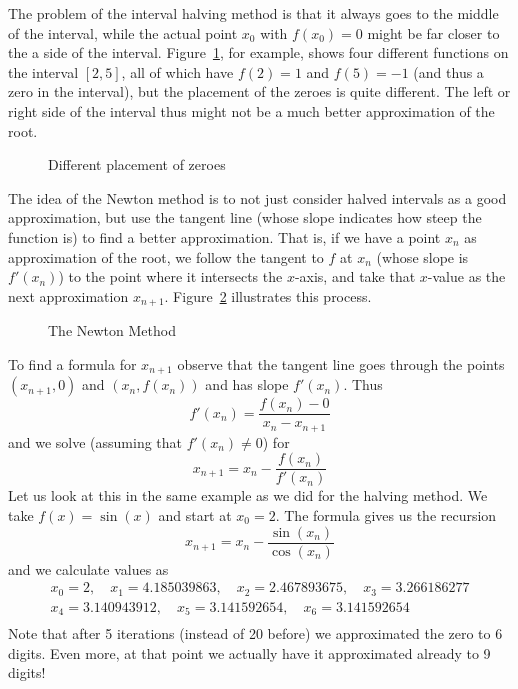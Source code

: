 The problem of the interval halving method is that it always goes to the
middle of the interval, while the actual point $x_0$ with $f(x_0)=0$ might
be far closer to the a side of the interval. Figure~\ref{fignewton4}, for
example, shows four different functions on the interval $[2,5]$, all of
which have $f(2)=1$ and $f(5)=-1$ (and thus a zero in the interval), but the
placement of the zeroes is quite different. The left or right side of the
interval thus might not be a much better approximation of the root.
\begin{figure}
\begin{center}
\end{center}
\caption{Different placement of zeroes}
\label{fignewton4}
\end{figure}

The idea of the Newton method is to not just consider halved intervals
as a good approximation, but use the tangent line (whose slope
indicates how steep the function is) to find a better
approximation. That
is, if we have a point $x_n$ as approximation of the root, we follow the
tangent to $f$ at $x_n$ (whose slope is $f'(x_n)$) to the point where it
intersects the $x$-axis, and take that $x$-value as the next approximation
$x_{n+1}$. Figure~\ref{fignewtonm} illustrates this process.

\begin{figure}
\begin{center}
\end{center}
\caption{The Newton Method}
\label{fignewtonm}
\end{figure}

To find a formula for $x_{n+1}$ observe that the tangent line goes through
the points $(x_{n+1},0)$ and $(x_n,f(x_n))$ and has slope $f'(x_n)$. Thus
\[
f'(x_n)=\frac{f(x_n)-0}{x_n-x_{n+1}}
\]
and we solve (assuming that $f'(x_n)\not=0$) for
\[
x_{n+1}=x_n-\frac{f(x_n)}{f'(x_n)}
\]
Let us look at this in the same example as we did for the halving method. We
take $f(x)=\sin(x)$ and start at $x_0=2$. The formula gives us the recursion
\[
x_{n+1}=x_n-\frac{\sin(x_n)}{\cos(x_n)}
\]
and we calculate values as
\begin{eqnarray*}
&x_0=2, \quad x_1=4.185039863,\quad x_2=2.467893675, \quad x_3=3.266186277&\\
&x_4=3.140943912, \quad x_5=3.141592654,\quad x_6=3.141592654&\\
\end{eqnarray*}
Note that after 5 iterations (instead of 20 before) we approximated the zero
to $6$ digits. Even more, at that point we actually have it approximated
already to 9 digits!

